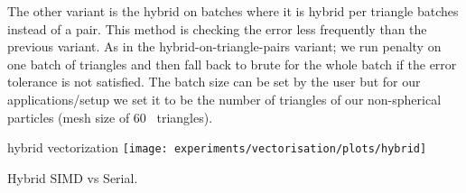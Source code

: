 The other variant is the hybrid on batches where it is hybrid per triangle batches instead of a pair. This method is checking the error less frequently than the previous variant. As in the hybrid-on-triangle-pairs variant; we run penalty on one batch of triangles and then fall back to brute for the whole batch if the error tolerance is not satisfied. The batch size can be set by the user but for our applications/setup we set it to be the number of triangles of our non-spherical particles (mesh size of 60~ triangles).    


hybrid vectorization
\texttt{[image: experiments/vectorisation/plots/hybrid]} \protect\caption{\label{fig17}Hybrid SIMD vs Serial.}

